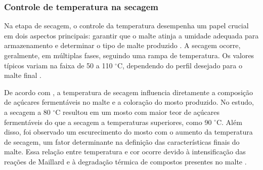\subsubsection{Controle de temperatura na secagem}

Na etapa de secagem, o controle da temperatura desempenha um papel crucial em dois aspectos principais: garantir que o 
malte atinja a umidade adequada para armazenamento e determinar o tipo de malte produzido \cite{KUNZE1996}. A secagem ocorre, 
geralmente, em múltiplas fases, seguindo uma rampa de temperatura. Os valores típicos variam na faixa de 50 a 110 $^{\circ}$C, 
dependendo do perfil desejado para o malte final \cite{LEWIS2012}.

De acordo com , a temperatura de secagem influencia diretamente a composição de açúcares fermentáveis no 
malte e a coloração do mosto produzido. No estudo, a secagem a 80 $^{\circ}$C resultou em um mosto com maior teor de açúcares 
fermentáveis do que a secagem a temperaturas superiores, como 90 $^{\circ}$C. Além disso, foi observado um escurecimento do mosto 
com o aumento da temperatura de secagem, um fator determinante na definição das características finais do malte. Essa relação entre 
temperatura e cor ocorre devido à intensificação das reações de Maillard e à degradação térmica de compostos presentes no malte \cite{KUNZE1996}.